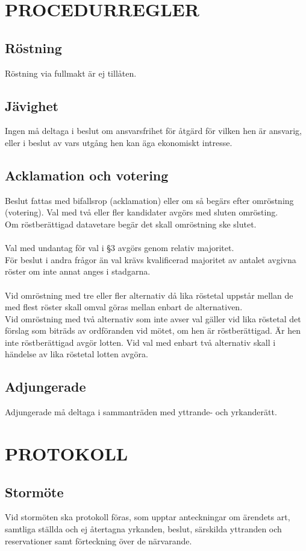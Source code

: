 \documentclass[a4paper]{article}
\begin{document}
{{  \section{PROCEDURREGLER}
  \subsection{Röstning}
  Röstning via fullmakt är ej tillåten.
  \subsection{Jävighet}
  Ingen må deltaga i beslut om ansvarsfrihet för åtgärd för vilken hen är ansvarig, eller i beslut av vars utgång hen kan äga ekonomiskt intresse.
  \subsection{Acklamation och votering}
  Beslut fattas med bifallsrop (acklamation) eller om så begärs efter omröstning (votering). Val med två eller fler kandidater avgörs med sluten omrösting.\\
  Om röstberättigad datavetare begär det skall omröstning ske slutet.\\
  \\
  Val med undantag för val i §3 avgörs genom relativ majoritet.\\
  För beslut i andra frågor än val krävs kvalificerad majoritet av antalet avgivna röster om inte annat anges i stadgarna.\\
  \\
  Vid omröstning med tre eller fler alternativ då lika röstetal uppstår mellan de med flest röster skall omval göras mellan enbart de alternativen.\\
  Vid omröstning med två alternativ som inte avser val gäller vid lika röstetal det förslag som biträds av ordföranden vid mötet, om hen är röstberättigad. Är hen inte röstberättigad avgör lotten. Vid val med enbart två alternativ skall i händelse av lika röstetal lotten avgöra. 
  \subsection{Adjungerade}
  Adjungerade må deltaga i sammanträden med yttrande- och yrkanderätt.}
\section{PROTOKOLL}
{\subsection{Stormöte}
  Vid stormöten ska protokoll föras, som upptar anteckningar om ärendets art, samtliga ställda och ej återtagna yrkanden, beslut, särskilda yttranden och reservationer samt förteckning över de närvarande.
}}
\end{document}
